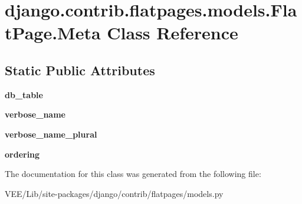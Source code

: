 \hypertarget{classdjango_1_1contrib_1_1flatpages_1_1models_1_1_flat_page_1_1_meta}{}\section{django.\+contrib.\+flatpages.\+models.\+Flat\+Page.\+Meta Class Reference}
\label{classdjango_1_1contrib_1_1flatpages_1_1models_1_1_flat_page_1_1_meta}
\subsection*{Static Public Attributes}
\begin{DoxyCompactItemize}
\item 
\mbox{\label{classdjango_1_1contrib_1_1flatpages_1_1models_1_1_flat_page_1_1_meta_af9bf000d136a3a7d61357674ac4a58aa}} 
{\bfseries db\+\_\+table}
\item 
\mbox{\label{classdjango_1_1contrib_1_1flatpages_1_1models_1_1_flat_page_1_1_meta_a928dddff40db192cae4b3dff39f4aea4}} 
{\bfseries verbose\+\_\+name}
\item 
\mbox{\label{classdjango_1_1contrib_1_1flatpages_1_1models_1_1_flat_page_1_1_meta_a08f0466cb6fb8c992a16e130bf6d44a2}} 
{\bfseries verbose\+\_\+name\+\_\+plural}
\item 
\mbox{\label{classdjango_1_1contrib_1_1flatpages_1_1models_1_1_flat_page_1_1_meta_af3374a72fafaa1d10d7a3e7679e7217f}} 
{\bfseries ordering}
\end{DoxyCompactItemize}


The documentation for this class was generated from the following file\+:\begin{DoxyCompactItemize}
\item 
V\+E\+E/\+Lib/site-\/packages/django/contrib/flatpages/models.\+py\end{DoxyCompactItemize}
